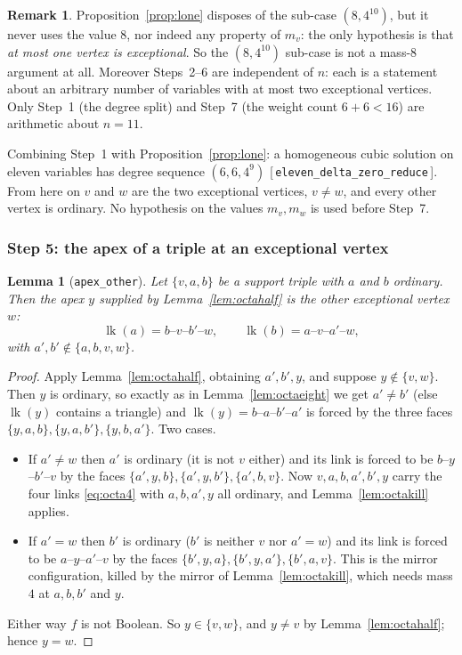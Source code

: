\documentclass[11pt,reqno]{amsart}
\newcommand{\leanref}[1]{\textup{[\,\texttt{#1}\,]}}
\theoremstyle{plain}
\newtheorem{lemma}[theorem]{Lemma}
\theoremstyle{definition}
\newtheorem{remark}[theorem]{Remark}
\numberwithin{theorem}{section}
\newcommand{\lk}{\operatorname{lk}}
\begin{document}
\begin{remark}\label{rem:no8}
Proposition~\ref{prop:lone} disposes of the sub-case $(8, 4^{10})$, but it never uses the value
$8$, nor indeed any property of $m_v$: the only hypothesis is that \emph{at most one vertex is
exceptional}. So the $(8, 4^{10})$ sub-case is not a mass-$8$ argument at all. Moreover
Steps~2--6 are independent of $n$: each is a statement about an arbitrary number of variables
with at most two exceptional vertices. Only Step~1 (the degree split) and Step~7 (the weight
count $6 + 6 < 16$) are arithmetic about $n = 11$.
\end{remark}

Combining Step~1 with Proposition~\ref{prop:lone}: a homogeneous cubic solution on eleven
variables has degree sequence $(6,6,4^9)$ \leanref{eleven\_delta\_zero\_reduce}. From here on
$v$ and $w$ are the two exceptional vertices, $v \ne w$, and every other vertex is ordinary.
No hypothesis on the values $m_v, m_w$ is used before Step~7.

\subsubsection*{Step 5: the apex of a triple at an exceptional vertex}

\begin{lemma}[\texttt{apex\_other}]\label{lem:apexother}
Let $\{v,a,b\}$ be a support triple with $a$ and $b$ ordinary. Then the apex $y$ supplied by
Lemma~\ref{lem:octahalf} is the \emph{other} exceptional vertex $w$:
\[
  \lk(a) = b\text{--}v\text{--}b'\text{--}w, \qquad \lk(b) = a\text{--}v\text{--}a'\text{--}w,
\]
with $a', b' \notin \{a,b,v,w\}$.
\end{lemma}

\begin{proof}
Apply Lemma~\ref{lem:octahalf}, obtaining $a', b', y$, and suppose $y \notin \{v,w\}$. Then $y$
is ordinary, so exactly as in Lemma~\ref{lem:octaeight} we get $a' \ne b'$ (else $\lk(y)$
contains a triangle) and $\lk(y) = b$--$a$--$b'$--$a'$ is forced by the three faces
$\{y,a,b\}, \{y,a,b'\}, \{y,b,a'\}$. Two cases.
\begin{itemize}[leftmargin=1.4em]
  \item If $a' \ne w$ then $a'$ is ordinary (it is not $v$ either) and its link is forced to be
  $b$--$y$--$b'$--$v$ by the faces $\{a',y,b\}, \{a',y,b'\}, \{a',b,v\}$. Now
  $v, a, b, a', b', y$ carry the four links \eqref{eq:octa4} with $a, b, a', y$ all ordinary, and
  Lemma~\ref{lem:octakill} applies.
  \item If $a' = w$ then $b'$ is ordinary ($b'$ is neither $v$ nor $a' = w$) and its link is
  forced to be $a$--$y$--$a'$--$v$ by the faces $\{b',y,a\}, \{b',y,a'\}, \{b',a,v\}$. This is
  the mirror configuration, killed by the mirror of Lemma~\ref{lem:octakill}, which needs mass
  $4$ at $a, b, b'$ and $y$.
\end{itemize}
Either way $f$ is not Boolean. So $y \in \{v,w\}$, and $y \ne v$ by Lemma~\ref{lem:octahalf};
hence $y = w$.
\end{proof}
\end{document}
